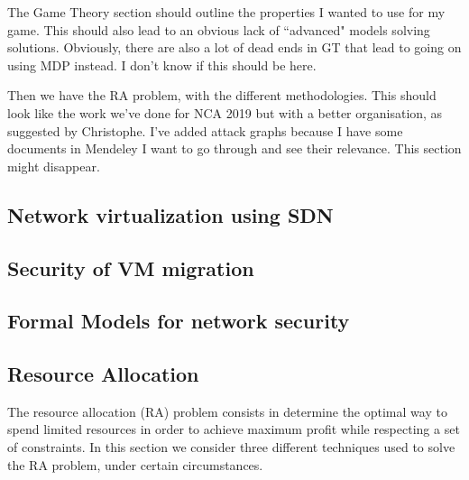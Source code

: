 \documentclass[a4paper, 11pt]{article}
\begin{document}
The Game Theory section should outline the properties I wanted to use for my game. This should also lead to an obvious lack of ``advanced" models solving solutions. Obviously, there are also a lot of dead ends in GT that lead to going on using MDP instead. I don't know if this should be here.

Then we have the RA problem, with the different methodologies. This should look like the work we've done for NCA 2019 but with a better organisation, as suggested by Christophe. I've added attack graphs because I have some documents in Mendeley I want to go through and see their relevance. This section might disappear.


\subsection{Network virtualization using SDN}











\subsection{Security of VM migration}



\subsection{Formal Models for network security}



\subsection{Resource Allocation}
The resource allocation (RA) problem consists in determine the optimal way to spend limited resources in order to achieve maximum profit while respecting a set of constraints.
In this section we consider three different techniques used to solve the RA problem, under certain circumstances. 





\end{document}
